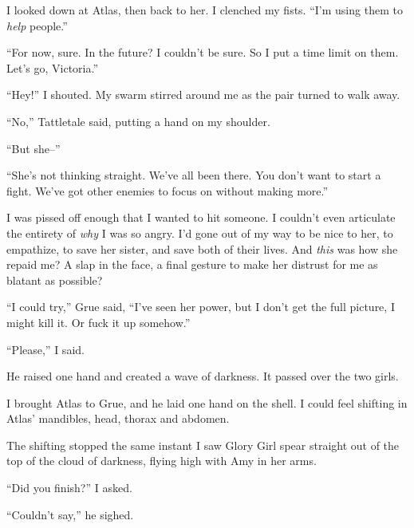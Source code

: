 I looked down at Atlas, then back to her.  I clenched my fists.  ``I'm using them to \emph{help} people.''



``For now, sure.  In the future?  I couldn't be sure.  So I put a time limit on them.  Let's go, Victoria.''



``Hey!''  I shouted.  My swarm stirred around me as the pair turned to walk away.



``No,'' Tattletale said, putting a hand on my shoulder.



``But she--''



``She's not thinking straight.  We've all been there.  You don't want to start a fight.  We've got other enemies to focus on without making more.''



I was pissed off enough that I wanted to hit someone.  I couldn't even articulate the entirety of \emph{why} I was so angry.  I'd gone out of my way to be nice to her, to empathize, to save her sister, and save both of their lives.  And \emph{this} was how she repaid me?  A slap in the face, a final gesture to make her distrust for me as blatant as possible?



``I could try,'' Grue said, ``I've seen her power, but I don't get the full picture, I might kill it.  Or fuck it up somehow.''



``Please,'' I said.



He raised one hand and created a wave of darkness.  It passed over the two girls.



I brought Atlas to Grue, and he laid one hand on the shell.  I could feel shifting in Atlas' mandibles, head, thorax and abdomen.



The shifting stopped the same instant I saw Glory Girl spear straight out of the top of the cloud of darkness, flying high with Amy in her arms.



``Did you finish?''  I asked.



``Couldn't say,'' he sighed.



